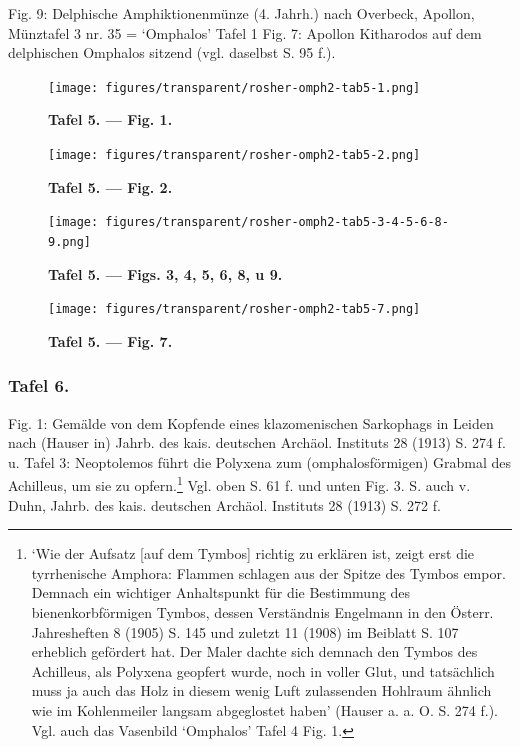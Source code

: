 \documentclass[a4paper, 11pt, oneside]{article}
\begin{document}
Fig. 9: Delphische Amphiktionenmünze (4. Jahrh.) nach Overbeck, Apollon, Münztafel 3 nr. 35 = `Omphalos' Tafel 1 Fig. 7: Apollon Kitharodos auf dem delphischen Omphalos sitzend (vgl. daselbst S. 95 f.).
\clearpage
\vspace*{\fill}
\begin{figure}[H]
\centering
\texttt{[image: figures/transparent/rosher-omph2-tab5-1.png]}
\caption{\bfseries Tafel 5. --- Fig. 1.}
\end{figure}
\vspace*{\fill}
\clearpage
\vspace*{\fill}
\begin{figure}[H]
\centering
\texttt{[image: figures/transparent/rosher-omph2-tab5-2.png]}
\caption{\bfseries Tafel 5. --- Fig. 2.}
\end{figure}
\vspace*{\fill}
\clearpage
\vspace*{\fill}
\begin{figure}[H]
\centering
\texttt{[image: figures/transparent/rosher-omph2-tab5-3-4-5-6-8-9.png]}
\caption{\bfseries Tafel 5. --- Figs. 3, 4, 5, 6, 8, u 9.}
\end{figure}
\vspace*{\fill}
\clearpage
\vspace*{\fill}
\begin{figure}[H]
\centering
\texttt{[image: figures/transparent/rosher-omph2-tab5-7.png]}
\caption{\bfseries Tafel 5. --- Fig. 7.}
\end{figure}
\vspace*{\fill}
\clearpage
\subsubsection{Tafel 6.}

Fig. 1: Gemälde von dem Kopfende eines klazomenischen Sarkophags in Leiden nach (Hauser in) Jahrb. des kais. deutschen Archäol. Instituts 28 (1913) S. 274 f. u. Tafel 3: Neoptolemos führt die Polyxena zum (omphalosförmigen) Grabmal des Achilleus, um sie zu opfern.\footnote{`Wie der Aufsatz [auf dem Tymbos] richtig zu erklären ist, zeigt erst die tyrrhenische Amphora: Flammen schlagen aus der Spitze des Tymbos empor. Demnach ein wichtiger Anhaltspunkt für die Bestimmung des bienenkorbförmigen Tymbos, dessen Verständnis Engelmann in den Österr. Jahresheften 8 (1905) S. 145 und zuletzt 11 (1908) im Beiblatt S. 107 erheblich gefördert hat. Der Maler dachte sich demnach den Tymbos des Achilleus, als Polyxena geopfert wurde, noch in voller Glut, und tatsächlich muss ja auch das Holz in diesem wenig Luft zulassenden Hohlraum ähnlich wie im Kohlenmeiler langsam abgeglostet haben' (Hauser a. a. O. S. 274 f.). Vgl. auch das Vasenbild `Omphalos' Tafel 4 Fig. 1.} Vgl. oben S. 61 f. und unten Fig. 3. S. auch v. Duhn, Jahrb. des kais. deutschen Archäol. Instituts 28 (1913) S. 272 f.
\end{document}
